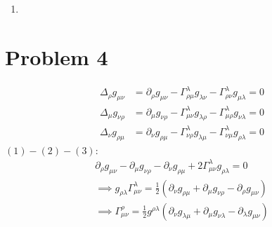 \documentclass[12pt]{article}
\newcommand{\chrissym}[3]{\Gamma_{#2#3}^#1}
\begin{document}
\begin{enumerate}[label=(\alph*)]
\begin{align*}
        &= -\int\frac{R\dd z}{\sqrt{R^2\left(1 - \cos^2\theta\right) - L^2}} \\
        &= -\int\frac{R\dd z}{\sqrt{R^2 - L^2 - z^2}} \\
        &= \frac{-1}{\sqrt{R^2-L^2}}\int\frac{R\dd z}{\sqrt{1 - \frac{z^2}{R^2 - L^2}}} \\
        &= R\cos^{-1}\left(\frac{z}{\sqrt{R^2 - L^2}}\right) + C \\
        &= R\cos^{-1}\left(\frac{\sin I \cos\psi}{1 - \cos^2I}\right) + C \\
        &= R\cos^{-1}\left(\frac{\cos\psi}{\sin I}\right) + C \\
        \implies \qquad \frac{\cos\psi}{\sin I} &= \cos{\frac{s - C}{R}}
    \end{align*}

    \item
\end{enumerate}


\section*{Problem 4}
\begin{align}
    \Delta_\rho g_{\mu\nu} &= \partial_\rho g_{\mu\nu} - \chrissym{\lambda}{\rho}{\mu}g_{\lambda\nu} - \chrissym{\lambda}{\rho}{\nu}g_{\mu\lambda} = 0 \\
    \Delta_\mu g_{\nu\rho} &= \partial_\mu g_{\nu\rho} - \chrissym{\lambda}{\mu}{\nu}g_{\lambda\rho} - \chrissym{\lambda}{\mu}{\rho}g_{\nu\lambda} = 0 \\
    \Delta_\nu g_{\rho\mu} &= \partial_\nu g_{\rho\mu} - \chrissym{\lambda}{\nu}{\rho}g_{\lambda\mu} - \chrissym{\lambda}{\nu}{\mu}g_{\rho\lambda} = 0
\end{align}
$(1) - (2) - (3)$:
\begin{align*}
    \partial_\rho g_{\mu\nu} - \partial_\mu g_{\nu\rho} - \partial_\nu g_{\rho\mu} + 2\chrissym{\lambda}{\mu}{\nu}g_{\rho\lambda} = 0 \\
    \implies g_{\rho\lambda}\chrissym{\lambda}{\mu}{\nu} = \frac{1}{2}\left(\partial_\nu g_{\rho\mu} + \partial_\mu g_{\nu\rho} - \partial_\rho g_{\mu\nu} \right) \\
    \implies \chrissym{\rho}{\mu}{\nu} = \frac{1}{2} g^{\rho\lambda}\left(\partial_\nu g_{\lambda\mu} + \partial_\mu g_{\nu\lambda} - \partial_\lambda g_{\mu\nu}\right)
\end{align*}
\end{document}
